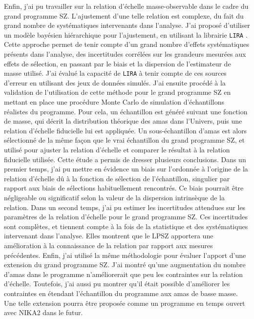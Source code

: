 Enfin, j'ai pu travailler sur la relation d'échelle masse-observable dans le cadre du grand programme SZ.
L'ajustement d'une telle relation est complexe, du fait du grand nombre de systématiques intervenants dans l'analyse.
J'ai proposé d'utiliser un modèle bayésien hiérarchique pour l'ajustement, en utilisant la librairie \texttt{LIRA} \cite{sereno_bayesian_2016}.
Cette approche permet de tenir compte d'un grand nombre d'effets systématiques présents dans l'analyse, des incertitudes corrélées sur les grandeurs mesurées aux effets de sélection, en passant par le biais et la dispersion de l'estimateur de masse utilisé.
J'ai évalué la capacité de \texttt{LIRA} à tenir compte de ces sources d'erreur en utilisant des jeux de données simulés.
J'ai ensuite procédé à la validation de l'utilisation de cette méthode pour le grand programme SZ en mettant en place une procédure Monte Carlo de simulation d'échantillons réalistes du programme.
Pour cela, un échantillon est généré suivant une fonction de masse, qui décrit la distribution théorique des amas dans l'Univers, puis une relation d'échelle fiducielle lui est appliquée.
Un sous-échantillon d'amas est alors sélectionné de la même façon que le vrai échantillon du grand programme SZ, et utilisé pour ajuster la relation d'échelle et comparer le résultat à la relation fiducielle utilisée.
Cette étude a permis de dresser plusieurs conclusions.
Dans un premier temps, j'ai pu mettre en évidence un biais sur l'ordonnée à l'origine de la relation d'échelle dû à la fonction de sélection de l'échantillon, singulier par rapport aux biais de sélections habituellement rencontrés.
Ce biais pourrait être négligeable ou significatif selon la valeur de la dispersion intrinsèque de la relation.
Dans un second temps, j'ai pu estimer les incertitudes attendues sur les paramètres de la relation d'échelle pour le grand programme SZ.
Ces incertitudes sont complètes, et tiennent compte à la fois de la statistique et des systématiques intervenant dans l'analyse.
Elles montrent que le LPSZ apportera une amélioration à la connaissance de la relation par rapport aux mesures précédentes.
Enfin, j'ai utilisé la même méthodologie pour évaluer l'apport d'une extension du grand programme SZ.
J'ai montré qu'une augmentation du nombre d'amas dans le programme n'améliorerait que peu les contraintes sur la relation d'échelle.
Toutefois, j'ai aussi pu montrer qu'il était possible d'améliorer les contraintes en étendant l'échantillon du programme aux amas de basse masse.
Une telle extension pourra être proposée comme un programme en temps ouvert avec NIKA2 dans le futur.
